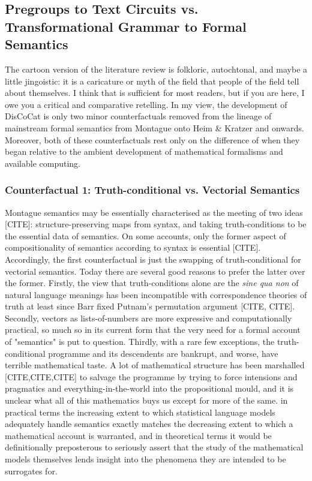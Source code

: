 \subsection{Pregroups to Text Circuits vs. Transformational Grammar to Formal Semantics}

The cartoon version of the literature review is folkloric, autochtonal, and maybe a little jingoistic: it is a caricature or myth of the field that people of the field tell about themselves. I think that is sufficient for most readers, but if you are here, I owe you a critical and comparative retelling. In my view, the development of DisCoCat is only two minor counterfactuals removed from the lineage of mainstream formal semantics from Montague onto Heim \& Kratzer and onwards. Moreover, both of these counterfactuals rest only on the difference of when they began relative to the ambient development of mathematical formalisms and available computing.\\

\subsubsection{Counterfactual 1: Truth-conditional vs. Vectorial Semantics}

Montague semantics may be essentially characterised as the meeting of two ideas [CITE]: structure-preserving maps from syntax, and taking truth-conditions to be the essential data of semantics. On some accounts, only the former aspect of compositionality of semantics according to syntax is essential [CITE]. Accordingly, the first counterfactual is just the swapping of truth-conditional for vectorial semantics. Today there are several good reasons to prefer the latter over the former. Firstly, the view that truth-conditions alone are the \emph{sine qua non} of natural language meanings has been incompatible with correspondence theories of truth at least since Barr fixed Putnam's permutation argument [CITE, CITE]. Secondly, vectors as lists-of-numbers are more expressive and computationally practical, so much so in its current form that the very need for a formal account of "semantics" is put to question. Thirdly, with a rare few exceptions, the truth-conditional programme and its descendents are bankrupt, and worse, have terrible mathematical taste. A lot of mathematical structure has been marshalled [CITE,CITE,CITE] to salvage the programme by trying to force intensions and pragmatics and everything-in-the-world into the propositional mould, and it is unclear what all of this mathematics buys us except for more of the same. in practical terms the increasing extent to which statistical language models adequately handle semantics exactly matches the decreasing extent to which a mathematical account is warranted, and in theoretical terms it would be definitionally preposterous to seriously assert that the study of the mathematical models themselves lends insight into the phenomena they are intended to be surrogates for.\\

